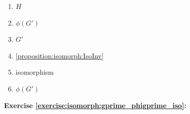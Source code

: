 %

\begin{multicols}{3}
\begin{enumerate}
\item
$H$

\item
$\phi(G')$

\item
$G'$

\item
\ref {proposition:isomorph:IsoInv}

\item
isomorphism

\item
$\phi(G')$
\end{enumerate}
\end{multicols}

\noindent\textbf{Exercise \ref{exercise:isomorph:gprime_phigprime_iso}:}
%
%
%

